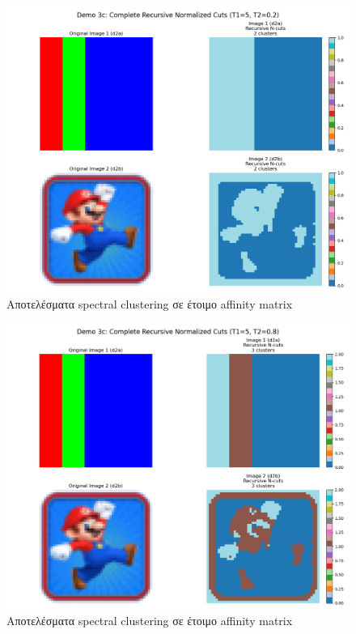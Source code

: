 \documentclass{article}
\begin{document}
\begin{figure}
    \centering
    \includegraphics[width=\linewidth]{Figure_5.png}
    \caption{Αποτελέσματα spectral clustering σε έτοιμο affinity matrix}\label{figure5}
\end{figure}


\begin{figure}
    \centering
    \includegraphics[width=\linewidth]{Figure_6.png}
    \caption{Αποτελέσματα spectral clustering σε έτοιμο affinity matrix}\label{figure6}
\end{figure}
\end{document}
